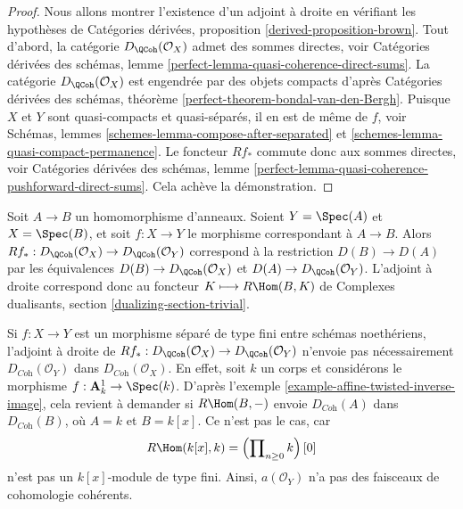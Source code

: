 \begin{proof}
Nous allons montrer l'existence d'un adjoint à droite en vérifiant les hypothèses de Catégories dérivées, proposition \ref{derived-proposition-brown}. Tout d'abord, la catégorie $D_\QCoh(\mathcal{O}_X)$ admet des sommes directes, voir Catégories dérivées des schémas, lemme \ref{perfect-lemma-quasi-coherence-direct-sums}. La catégorie $D_\QCoh(\mathcal{O}_X)$ est engendrée par des objets compacts d'après Catégories dérivées des schémas, théorème \ref{perfect-theorem-bondal-van-den-Bergh}. Puisque $X$ et $Y$ sont quasi-compacts et quasi-séparés, il en est de même de $f$, voir Schémas, lemmes \ref{schemes-lemma-compose-after-separated} et \ref{schemes-lemma-quasi-compact-permanence}. Le foncteur $Rf_*$ commute donc aux sommes directes, voir Catégories dérivées des schémas, lemme \ref{perfect-lemma-quasi-coherence-pushforward-direct-sums}. Cela achève la démonstration.
\end{proof}

\begin{example}
\label{example-affine-twisted-inverse-image}
Soit $A \to B$ un homomorphisme d'anneaux. Soient $Y = \Spec(A)$ et $X = \Spec(B)$, et soit $f : X \to Y$ le morphisme correspondant à $A \to B$. Alors $Rf_* : D_\QCoh(\mathcal{O}_X) \to D_\QCoh(\mathcal{O}_Y)$ correspond à la restriction $D(B) \to D(A)$ par les équivalences $D(B) \to D_\QCoh(\mathcal{O}_X)$ et $D(A) \to D_\QCoh(\mathcal{O}_Y)$. L'adjoint à droite correspond donc au foncteur $K \longmapsto R\Hom(B, K)$ de Complexes dualisants, section \ref{dualizing-section-trivial}.
\end{example}

\begin{example}
\label{example-does-not-preserve-coherent}
Si $f : X \to Y$ est un morphisme séparé de type fini entre schémas noethériens, l'adjoint à droite de $Rf_* : D_\QCoh(\mathcal{O}_X) \to D_\QCoh(\mathcal{O}_Y)$ n'envoie pas nécessairement $D_{\textit{Coh}}(\mathcal{O}_Y)$ dans $D_{\textit{Coh}}(\mathcal{O}_X)$. En effet, soit $k$ un corps et considérons le morphisme $f : \mathbf{A}^1_k \to \Spec(k)$. D'après l'exemple \ref{example-affine-twisted-inverse-image}, cela revient à demander si $R\Hom(B, -)$ envoie $D_{\textit{Coh}}(A)$ dans $D_{\textit{Coh}}(B)$, où $A = k$ et $B = k[x]$. Ce n'est pas le cas, car
$$
R\Hom(k[x], k) = \left(\prod\nolimits_{n \geq 0} k\right)[0]
$$
n'est pas un $k[x]$-module de type fini. Ainsi, $a(\mathcal{O}_Y)$ n'a pas des faisceaux de cohomologie cohérents.
\end{example}

